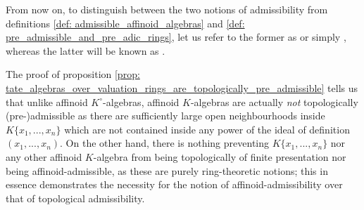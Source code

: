             \begin{convention} \label{conv: admissibility_and_topological_admissibility}
                From now on, to distinguish between the two notions of admissibility from definitions \ref{def: admissible_affinoid_algebras} and \ref{def: pre_admissible_and_pre_adic_rings}, let us refer to the former as  or simply , whereas the latter will be known as .
            \end{convention}
            \begin{remark}
                The proof of proposition \ref{prop: tate_algebras_over_valuation_rings_are_topologically_pre_admissible} tells us that unlike affinoid $K^{\circ}$-algebras, affinoid $K$-algebras are actually \textit{not} topologically (pre-)admissible as there are sufficiently large open neighbourhoods inside $K\{x_1, ..., x_n\}$ which are not contained inside any power of the ideal of definition $(x_1, ..., x_n)$. On the other hand, there is nothing preventing $K\{x_1, ..., x_n\}$ nor any other affinoid $K$-algebra from being topologically of finite presentation nor being affinoid-admissible, as these are purely ring-theoretic notions; this in essence demonstrates the necessity for the notion of affinoid-admissibility over that of topological admissibility.
            \end{remark}
            
